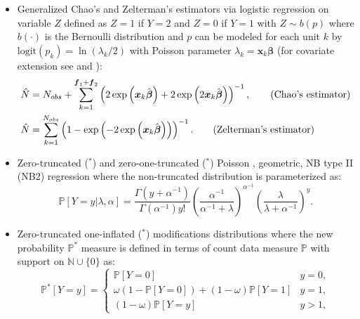 \documentclass[
]{jss}
\newcommand{\1}{\mathcal{I}} \newcommand{\bZero}{\boldsymbol{0}}
\begin{document}
\begin{itemize}
    \item Generalized Chao's \citep{chao1987estimating} and Zelterman's \citep{zelterman1988robust} estimators via logistic regression on variable $Z$ defined as $Z=1$ if $Y=2$ and $Z=0$ if $Y=1$ with $Z\sim b(p)$ where $b(\cdot)$ is the Bernoulli distribution and $p$ can be modeled for each unit $k$ by $\text{logit}(p_k)=\ln(\lambda_k/2)$ with Poisson parameter $\lambda_k=\boldsymbol{x}_{k}\boldsymbol{\beta}$ (for covariate extension see \cite{chao-generalization} and \cite{zelterman}):
    \begin{align}
        \hat{N} &= N_{obs}+
        \sum_{k=1}^{\boldsymbol{f}_{1}+\boldsymbol{f}_{2}}
        \left(2\exp\left(\boldsymbol{x}_{k}\hat{\boldsymbol{\beta}}\right)+
        2\exp\left(2\boldsymbol{x}_{k}\hat{\boldsymbol{\beta}}\right)\right)^{-1},
        \tag{\text{Chao's estimator}}\\
        \hat{N}&=\sum_{k=1}^{N_{obs}}
        \left(1-\exp\left(-2\exp\left(\boldsymbol{x}_{k}\hat{\boldsymbol{\beta}}\right)\right)\right)^{-1}.
        \tag{\text{Zelterman's estimator}}
    \end{align}
    \item Zero-truncated ($^\ast$) and zero-one-truncated ($^\ast$) Poisson \citep[cf. ][]{zotmodels}, geometric, NB type II (NB2) regression where the non-truncated distribution is parameterized as:
    \begin{equation*}
        \mathbb{P}[Y=y|\lambda,\alpha] = \frac{\Gamma\left(y+\alpha^{-1}\right)}{\Gamma\left(\alpha^{-1}\right)y!}
        \left(\frac{\alpha^{-1}}{\alpha^{-1}+\lambda}\right)^{\alpha^{-1}}
        \left(\frac{\lambda}{\lambda + \alpha^{-1}}\right)^{y}.
    \end{equation*}
    \item Zero-truncated one-inflated ($^\ast$) modifications distributions where the new probability $\mathbb{P}^{\ast}$ measure is defined in terms of count data measure $\mathbb{P}$ with support on $\mathbb{N}\cup\{0\}$ as:
    \begin{equation*}
    \mathbb{P}^{\ast}[Y=y]=
    \begin{cases}
    \mathbb{P}[Y=0] & y=0, \\
    \omega\left(1-\mathbb{P}[Y=0]\right)+(1-\omega)\mathbb{P}[Y=1] & y=1, \\
    (1-\omega)\mathbb{P}[Y=y] & y>1,
    \end{cases}
    \end{equation*}

\end{itemize}
\end{document}
